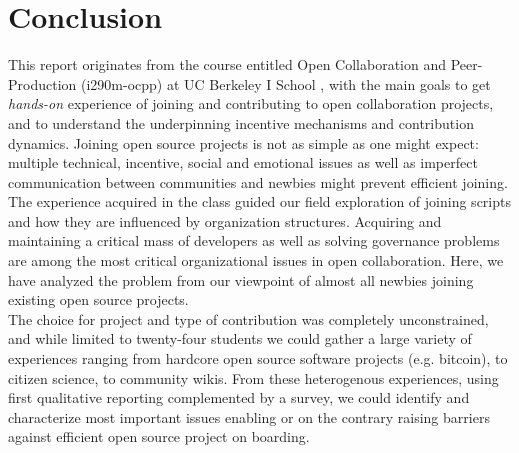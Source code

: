 \section{Conclusion}

This report originates from the course entitled Open Collaboration and Peer-Production (i290m-ocpp) \cite{classweb2013} at UC Berkeley I School , with the main goals to get {\it hands-on} experience of joining and contributing to open collaboration projects, and to understand the underpinning incentive mechanisms and contribution dynamics. Joining open source projects is not as simple as one might expect: multiple technical, incentive, social and emotional issues as well as imperfect communication between communities and newbies might prevent efficient joining. \\

\noindent The experience acquired in the class guided our field exploration of joining scripts and how they are influenced by organization structures. Acquiring and maintaining a critical mass of developers as well as solving governance problems are among the most critical organizational issues in open collaboration. Here, we have analyzed the problem from our viewpoint of almost all newbies joining existing open source projects.\\

\noindent The choice for project and type of contribution was completely unconstrained, and while limited to twenty-four students we could gather a large variety of experiences ranging from hardcore open source software projects (e.g. bitcoin), to citizen science, to community wikis. From these heterogenous experiences, using first qualitative reporting complemented by a survey, we could identify and characterize most important issues enabling or on the contrary raising barriers against efficient open source project on boarding.\\ 

